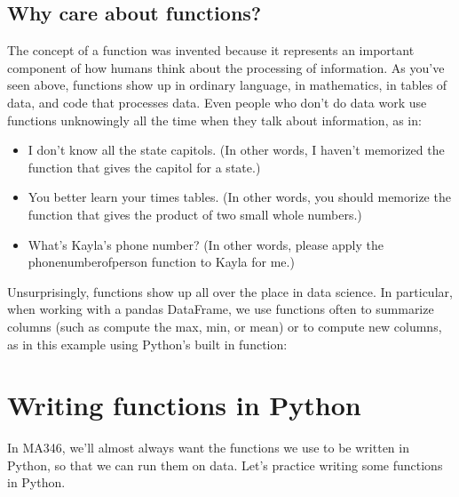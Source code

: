 \documentclass[letterpaper,10pt,english]{sphinxmanual}
\begin{document}
\subsection{Why care about functions?}
\label{\detokenize{chapter-2-mathematical-foundations:why-care-about-functions}}
The concept of a function was invented because it represents an important component of how humans think about the processing of information.  As you’ve seen above, functions show up in ordinary language, in mathematics, in tables of data, and code that processes data.  Even people who don’t do data work use functions unknowingly all the time when they talk about information, as in:
\begin{itemize}
\item {} 
I don’t know all the state capitols. (In other words, I haven’t memorized the function that gives the capitol for a state.)

\item {} 
You better learn your times tables. (In other words, you should memorize the function that gives the product of two small whole numbers.)

\item {} 
What’s Kayla’s phone number? (In other words, please apply the phone\sphinxhyphen{}number\sphinxhyphen{}of\sphinxhyphen{}person function to Kayla for me.)

\end{itemize}

Unsurprisingly, functions show up all over the place in data science.  In particular, when working with a pandas DataFrame, we use functions often to summarize columns (such as compute the max, min, or mean) or to compute new columns, as in this example using Python’s built in \sphinxcode{\sphinxupquote{/}} function:

\begin{sphinxVerbatim}[commandchars=\\\{\}]
\PYG{p}{[}\PYG{p}{]}  \PYG{p}{[}\PYG{p}{]}  \PYG{p}{[}\PYG{p}{]}
\end{sphinxVerbatim}


\section{Writing functions in Python}
\label{\detokenize{chapter-2-mathematical-foundations:writing-functions-in-python}}
In MA346, we’ll almost always want the functions we use to be written in Python, so that we can run them on data.  Let’s practice writing some functions in Python.
\end{document}
